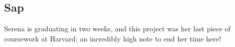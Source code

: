 \documentclass[preprint,review,12pt]{cs262}
\begin{document}
\subsection{Sap}

Serena is graduating in two weeks, and this project was her last piece of coursework at Harvard; an incredibly high note to end her time here! 







% 
% 
% 
% 
% 
% 
% 
% 
% 
% 
% 
% 


\end{document}
